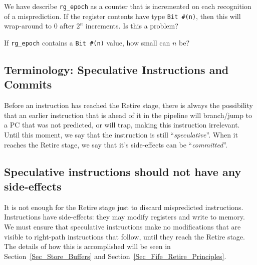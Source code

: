 \hdivider

\Exercise

We have describe \verb|rg_epoch| as a counter that is incremented on
each recognition of a misprediction.  If the register contents have
type \verb|Bit #(n)|, then this will wrap-around to 0 after $2^n$
increments.  Is this a problem?

\Exercise

If \verb|rg_epoch| contains a \verb|Bit #(n)| value, how small can $n$ be?

\Endexercise


\subsection{Terminology: Speculative Instructions and Commits}


Before an instruction has reached the Retire stage, there is always
the possibility that an earlier instruction that is ahead of it in the
pipeline will branch/jump to a PC that was not predicted, or will
trap, making this instruction irrelevant.  Until this moment, we say
that the instruction is still ``\emph{speculative}''.  When it reaches
the Retire stage, we say that it's side-effects can be
``\emph{committed}''.


\subsection{Speculative instructions should not have any side-effects}

It is not enough for the Retire stage just to discard mispredicted
instructions.  Instructions have side-effects: they may modify
registers and write to memory.  We must ensure that speculative
instructions make no modifications that are visible to right-path
instructions that follow, until they reach the Retire stage.  The
details of how this is accomplished will be seen in
Section~\ref{Sec_Store_Buffers} and Section~\ref{Sec_Fife_Retire_Principles}.


